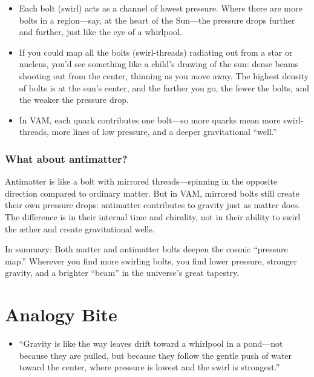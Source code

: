 \begin{itemize}

\item
Each bolt (swirl) acts as a channel of lowest pressure. Where there are more bolts in a region—say, at the heart of the Sun—the pressure drops further and further, just like the eye of a whirlpool.




\item
If you could map all the bolts (swirl-threads) radiating out from a star or nucleus, you’d see something like a child’s drawing of the sun: dense beams shooting out from the center, thinning as you move away. The highest density of bolts is at the sun’s center, and the farther you go, the fewer the bolts, and the weaker the pressure drop.




\item
In VAM, each quark contributes one bolt—so more quarks mean more swirl-threads, more lines of low pressure, and a deeper gravitational “well.”




\end{itemize}

\subsubsection*{What about antimatter?}

Antimatter is like a bolt with mirrored threads—spinning in the opposite direction compared to ordinary matter. But in VAM, mirrored bolts still create their own pressure drops: antimatter contributes to gravity just as matter does. The difference is in their internal time and chirality, not in their ability to swirl the æther and create gravitational wells.


In summary: Both matter and antimatter bolts deepen the cosmic “pressure map.” Wherever you find more swirling bolts, you find lower pressure, stronger gravity, and a brighter “beam” in the universe’s great tapestry.



\section*{Analogy Bite}

\begin{itemize}

\item
“Gravity is like the way leaves drift toward a whirlpool in a pond—not because they are pulled, but because they follow the gentle push of water toward the center, where pressure is lowest and the swirl is strongest.”




\end{itemize}